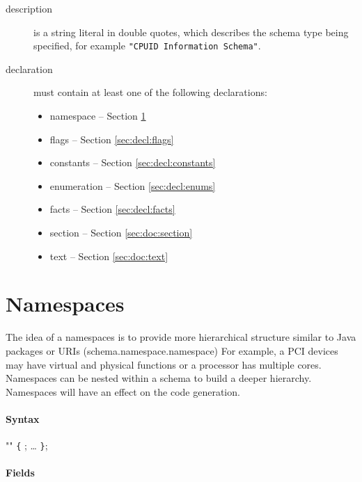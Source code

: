 \documentclass[a4paper,11pt,twoside]{report}
\begin{document}
{{\begin{description}
\item [description] is a string literal in double quotes, which
  describes the schema type being specified, for example \texttt{"CPUID 
  Information Schema"}. 

\item [declaration] must contain at least one of the following declarations:
    \begin{itemize}
        \item namespace -- Section \ref{sec:decl:namespace}
        \item flags -- Section \ref{sec:decl:flags}
        \item constants -- Section \ref{sec:decl:constants}
        \item enumeration -- Section \ref{sec:decl:enums}
        \item facts -- Section \ref{sec:decl:facts}
        \item section -- Section \ref{sec:doc:section}
        \item text -- Section \ref{sec:doc:text}
    \end{itemize}

\end{description}



\section{Namespaces}
\label{sec:decl:namespace}

The idea of a namespaces is to provide more hierarchical structure similar to 
Java packages or URIs (schema.namespace.namespace) For example, a PCI devices 
may have virtual and physical functions or a processor has multiple cores. 
Namespaces can be nested within a schema to build a deeper hierarchy. 
Namespaces will have an effect on the code generation.


\paragraph{Syntax}

\begin{syntax}
  "" \verb+{+
    ;
    \ldots
\verb+}+;
\end{syntax}

\paragraph{Fields}

}}
\end{document}
